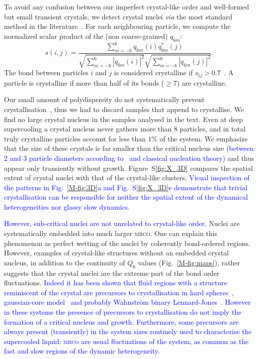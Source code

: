 \documentclass[prl,twocolumn,notitlepage]{revtex4-1}
\begin{document}
To avoid any confusion between our imperfect crystal-like order and well-formed but small transient crystals, we detect crystal nuclei \emph{via} the most standard method in the literature~\cite{ReintenWolde1996, Zaccarelli2009}. For each neighbouring particle, we compute the normalized scalar product of the (non coarse-grained) $q_{6 m}$:
\begin{equation}
	s(i,j) = \frac{
		\sum_{m=-6}^{6} q_{6 m}(i) q_{6 m}^{*}(j)
	}{
		\sqrt{\sum_{m=-6}^{6} |q_{6 m}(i)|^2} \sqrt{\sum_{m=-6}^{6} |q_{6 m}(j)|^2}
	}.
	\label{eq:boo_dot_product}
\end{equation}
The bond between particles $i$ and $j$ is considered crystalline if $s_{ij}>0.7$~\cite{Zaccarelli2009}. A particle is crystalline if more than half of its bonds ($\geq 7$) are crystalline. 

Our small amount of polydispersity do not systematically prevent crystallisation~\cite{Zaccarelli2009}, thus we had to discard samples that append to crystallise. We find no large crystal nucleus in the samples analysed in the text. Even at deep supercooling a crystal nucleus never gathers more than 8 particles, and in total truly crystalline particles account for less than $1\%$ of the system. We emphasize that the size of these crystals is far smaller than the critical nucleus size \textcolor{blue}{(between 2 and 3 particle diameters according to~\cite{Auer2001} and classical nucleation theory)} and thus appear only transiently without growth. Figure~S\ref{fig:X_3D} compares the spatial extent of crystal nuclei with that of the crystal-like clusters. \textcolor{blue}{Visual inspection of the patterns in Fig.~\ref{M-fig:3D}a and Fig.~S\ref{fig:X_3D}e demonstrate that trivial crystallisation can be responsible for neither the spatial extent of the dynamical heterogeneities nor glassy slow dynamics.}

\textcolor{blue}{However, sub-critical nuclei are not unrelated to crystal-like order.} Nuclei are systematically embedded into much larger \textsc{mrco}. One can explain this phenomenon as perfect wetting of the nuclei by coherently bond-ordered regions. However, examples of crystal-like structures without an embedded crystal nucleus, in addition to the continuity of $Q_6$ values (Fig.~\ref{M-fig:maps}), rather suggests that the crystal nuclei are the extreme part of the bond order fluctuations. \textcolor{blue}{Indeed it has been shown that fluid regions with a structure reminiscent of the crystal are precursors to crystallisation in hard spheres~\cite{OMalley2005, Schilling2010, Kawasaki2010c, Russo2011}, gaussian-core model~\cite{Russo2012} and probably Wahnstr\"om binary Lennard-Jones~\cite{Pedersen2010}. However in these systems the presence of precursors to crystallisation do not imply the formation of a critical nucleus and growth. Furthermore, some precursors are always present (transiently) in the system sizes routinely used to characterise the supercooled liquid: \textsc{mrco} are usual fluctuations of the system, as common as the fast and slow regions of the dynamic heterogeneity.}
\end{document}
